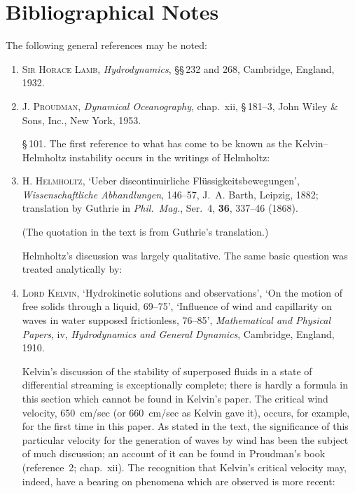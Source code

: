 \section*{Bibliographical Notes}

The following general references may be noted:

\begin{enumerate}

\item \textsc{Sir Horace Lamb}, \emph{Hydrodynamics},
  \S\S\,232 and 268, Cambridge, England, 1932.

\item \textsc{J. Proudman}, \emph{Dynamical Oceanography},
  chap.\ xii, \S\,181--3, John Wiley \& Sons, Inc., New York, 1953.

\medskip
\noindent\S\,101. The first reference to what has come to be known as the
Kelvin--Helmholtz instability occurs in the writings of Helmholtz:

\item \textsc{H. Helmholtz}, `Ueber discontinuirliche Fl\"ussigkeitsbewegungen',
  \emph{Wissenschaftliche Abhandlungen}, 146--57, J.~A. Barth, Leipzig, 1882;
  translation by Guthrie in \emph{Phil.\ Mag.}, Ser.~4, \textbf{36}, 337--46 (1868).

\smallskip\noindent
(The quotation in the text is from Guthrie's translation.)

\smallskip\noindent
Helmholtz's discussion was largely qualitative. The same basic question was
treated analytically by:

\item \textsc{Lord Kelvin}, `Hydrokinetic solutions and observations',
  `On the motion of free solids through a liquid, 69--75',
  `Influence of wind and capillarity on waves in water supposed frictionless, 76--85',
  \emph{Mathematical and Physical Papers}, iv,
  \emph{Hydrodynamics and General Dynamics}, Cambridge, England, 1910.

\smallskip\noindent
Kelvin's discussion of the stability of superposed fluids in a state of
differential streaming is exceptionally complete; there is hardly a formula
in this section which cannot be found in Kelvin's paper. The critical wind
velocity, 650~cm/sec (or 660~cm/sec as Kelvin gave it), occurs, for example,
for the first time in this paper. As stated in the text, the significance of
this particular velocity for the generation of waves by wind has been the
subject of much discussion; an account of it can be found in Proudman's book
(reference~2; chap.~xii). The recognition that Kelvin's critical velocity
may, indeed, have a bearing on phenomena which are observed is more recent:


\end{enumerate}
